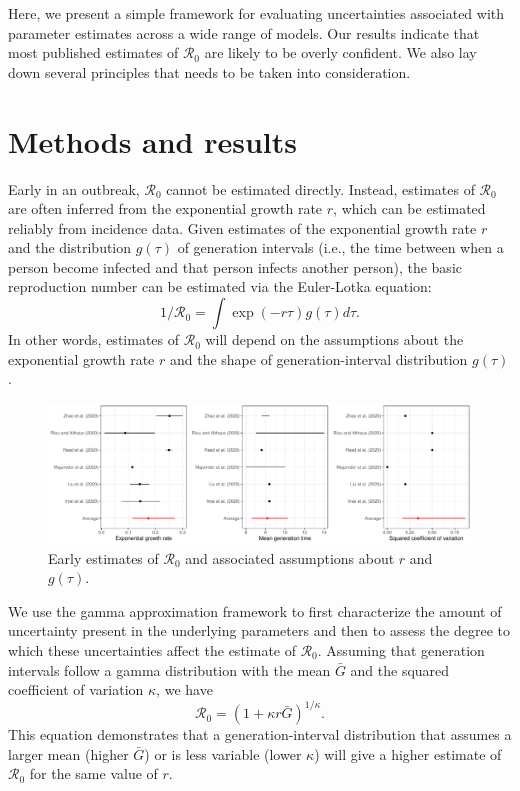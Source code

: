 \documentclass[12pt]{article}
\begin{document}
Here, we present a simple framework for evaluating uncertainties 
associated with parameter estimates
across a wide range of models.
Our results indicate that most published estimates of $\mathcal R_0$
are likely to be overly confident. 
We also lay down several principles that needs to be taken into
consideration.

\section{Methods and results}

Early in an outbreak, $\mathcal R_0$ cannot be estimated directly.
Instead, estimates of $\mathcal R_0$ are often inferred from
the exponential growth rate $r$, which can be estimated reliably from incidence data.
Given estimates of the exponential growth rate $r$ and the distribution $g(\tau)$ of
generation intervals (i.e., the time between when a person become 
infected and that person infects another person), the basic reproduction
number can be estimated via the Euler-Lotka equation:
\begin{equation}
1/\mathcal R_0 = \int \exp(-r\tau) g(\tau) d\tau.
\end{equation}
In other words, estimates of $\mathcal R_0$
will depend on the assumptions about the
exponential growth rate $r$ and the shape of generation-interval distribution $g(\tau)$.

\begin{figure}[t]
\includegraphics[width=\textwidth]{compare_assumption.pdf}
\caption{
Early estimates of $\mathcal R_0$ and associated assumptions about $r$ and $g(\tau)$.
}
\end{figure}

We use the gamma approximation framework to first characterize the
amount of uncertainty present in the underlying parameters and then 
to assess the 
degree to which these uncertainties
affect the estimate of $\mathcal R_0$.
Assuming that generation intervals follow a gamma distribution 
with the mean $\bar G$ and the squared coefficient of variation $\kappa$, 
we have
\begin{equation}
\mathcal R_0 = \left(1 + \kappa r \bar{G}\right)^{1/\kappa}.
\label{eq:gamma}
\end{equation}
This equation demonstrates that a generation-interval distribution
that assumes a larger mean (higher $\bar{G}$) or is less variable (lower $\kappa$)
will give a higher estimate of $\mathcal R_0$ for the same value of $r$.
\end{document}
